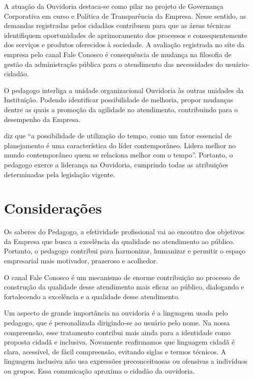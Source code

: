 \begin{refsection}
    A atuação da Ouvidoria destaca-se como pilar no projeto de Governança Corporativa em curso e Política de Transparência da Empresa. Nesse sentido, as demandas registradas pelos cidadãos contribuem para que as áreas técnicas identifiquem oportunidades de aprimoramento dos processos e consequentemente dos serviços e produtos oferecidos à sociedade. A avaliação registrada no site da empresa pelo canal Fale Conosco é consequência de mudança na filosofia de gestão da administração pública para o atendimento das necessidades do usuário-cidadão. 

    O pedagogo interliga a unidade organizacional Ouvidoria às outras unidades da Instituição. Podendo identificar possibilidade de melhoria, propor mudanças dentre as quais a promoção da agilidade no atendimento, contribuindo para o desempenho da Empresa.  

    \textcite[p.~44]{BOLONGNA2011desenvolvimento} diz que “a possibilidade de utilização do tempo, como um fator essencial de planejamento é uma característica do líder contemporâneo. Lidera melhor no mundo contemporâneo quem se relaciona melhor com o tempo”. Portanto, o pedagogo exerce a liderança na Ouvidoria, cumprindo todas as atribuições determinadas pela legislação vigente. 

    \section{Considerações}

    Os saberes do Pedagogo, a efetividade profissional vai ao encontro dos objetivos da Empresa que busca a excelência da qualidade no atendimento ao público. Portanto, o pedagogo contribui para harmonizar, humanizar e permitir o espaço empresarial mais motivador, prazeroso e acolhedor.  

    O canal Fale Conosco é um mecanismo de enorme contribuição no processo de construção da qualidade desse atendimento mais eficaz ao público, dialogando e fortalecendo a excelência e a qualidade desse atendimento.   

    Um aspecto de grande importância na ouvidoria é a linguagem usada pelo pedagogo, que é personalizada dirigindo-se ao usuário pelo nome. Na nossa compreensão, esse tratamento contribui mais ainda para a identidade como proposta cidadã e inclusiva. Novamente reafirmamos que linguagem cidadã é clara, acessível, de fácil compreensão, evitando siglas e termos técnicos. A linguagem inclusiva não usa expressões preconceituosas ou ofensivas a indivíduos ou grupos. Essa comunicação aproxima o cidadão da ouvidoria.  


\end{refsection}
